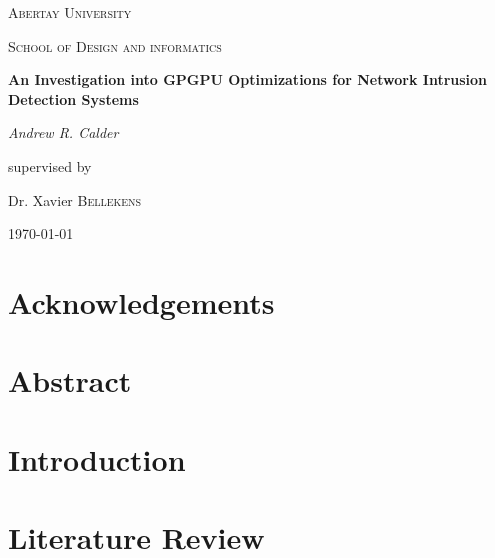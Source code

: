 \documentclass[9pt]{article}
\begin{document}
	\begin{titlepage}
		\centering
		{\scshape\LARGE Abertay University \par}
		\vspace{1cm}
		{\scshape School of Design and informatics \par}
		\vspace{1.5cm}
		{\Large\bfseries An Investigation into GPGPU Optimizations for Network Intrusion Detection Systems\par}
		\vspace{4cm}
		{\Large\itshape Andrew R. Calder\par}
		\vfill
		supervised by\par
		Dr. Xavier \textsc{Bellekens}
		\vfill
		{\large \today\par}
		\end{titlepage}
	\section* {Acknowledgements}
        
        \thispagestyle{empty}
		\clearpage

	\section*{Abstract}
		
		\thispagestyle{empty}
		\clearpage
		
	\singlespacing
	\tableofcontents
	\thispagestyle{empty}
	\clearpage
    \setcounter{tocdepth}{1} 
	\listoffigures
	\listoftables
	\thispagestyle{empty}
	\clearpage
	\onehalfspacing
	
    

	\section{Introduction}
	    
		\clearpage
		
	\section{Literature Review}
		
		\clearpage
		
\end{document}
